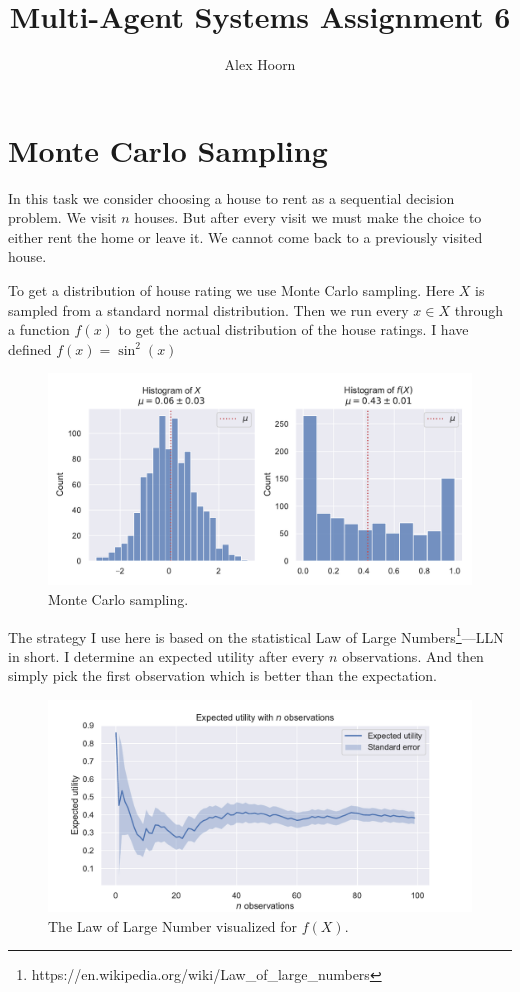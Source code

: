 \documentclass[]{scrartcl}
\title{Multi-Agent Systems Assignment 6}
\author{Alex Hoorn}
\begin{document}
\maketitle

\section{Monte Carlo Sampling}

In this task we consider choosing a house to rent as a sequential decision problem. We visit $n$ houses. But after every visit we must make the choice to either rent the home or leave it. We cannot come back to a previously visited house.

To get a distribution of house rating we use Monte Carlo sampling. Here $X$ is sampled from a standard normal distribution. Then we run every $x \in X$ through a function $f(x)$ to get the actual distribution of the house ratings. I have defined $f(x)=\sin^2(x)$

\begin{figure}[H]
	\centering
	\includegraphics[width=0.7\linewidth]{1-1.pdf}
	\caption{Monte Carlo sampling.}
	\label{fig:1-1}
\end{figure}

The strategy I use here is based on the statistical Law of Large Numbers\footnote{https://en.wikipedia.org/wiki/Law\_of\_large\_numbers}---LLN in short.
I determine an expected utility after every $n$ observations. And then simply pick the first observation which is better than the expectation.

\begin{figure}[H]
	\centering
	\includegraphics[width=0.7\linewidth]{1-2.pdf}
	\caption{The Law of Large Number visualized for $f(X)$.}
	\label{fig:1-2}
\end{figure}
\end{document}
